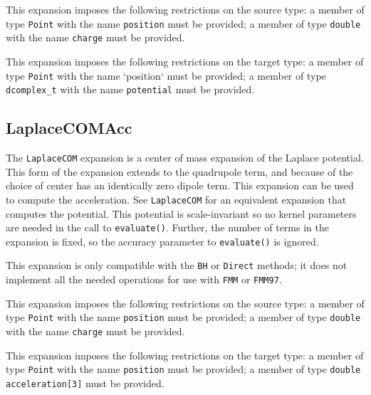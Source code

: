 This expansion imposes the following restrictions on the source type: a
member of type \texttt{Point} with the name \texttt{position} must be provided;
a member of type \texttt{double} with the name \texttt{charge} must be
provided.

This expansion imposes the following restrictions on the target type: a
member of type \texttt{Point} with the name `position` must be provided; a
member of type \texttt{dcomplex\_t} with the name \texttt{potential} must be
provided.

\subsection{LaplaceCOMAcc}

The \texttt{LaplaceCOM} expansion is a center of mass expansion of the Laplace
potential. This form of the expansion extends to the quadrupole term, and
because of the choice of center has an identically zero dipole term. This
expansion can be used to compute the acceleration. See \texttt{LaplaceCOM} for
an equivalent expansion that computes the potential. This potential is
scale-invariant so no kernel parameters are needed in the call to
\texttt{evaluate()}. Further, the number of terms in the expansion is fixed,
so the accuracy parameter to \texttt{evaluate()} is ignored.

This expansion is only compatible with the \texttt{BH} or \texttt{Direct}
methods; it does not implement all the needed operations for use with
\texttt{FMM} or \texttt{FMM97}.

This expansion imposes the following restrictions on the source type: a
member of type \texttt{Point} with the name \texttt{position} must be provided;
a member of  type \texttt{double} with the name \texttt{charge} must be
provided.

This expansion imposes the following restrictions on the target type: a
member of type \texttt{Point} with the name \texttt{position} must be provided;
a member of type \texttt{double acceleration[3]} must
be provided.